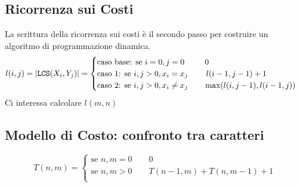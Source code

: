 \subsection{Ricorrenza sui Costi}
La scrittura della ricorrenza sui costi è il secondo passo per costruire un algoritmo di programmazione dinamica.
\begin{equation*}
l(i,j) = |\verb|LCS|(X_i,Y_j)| = 
\begin{cases}
    \text{caso base: se } i=0, j=0 \qquad\;\; 0 \\
    \text{caso 1: se } i,j>0, x_i = x_j \qquad\; l(i-1,j-1)+1 \\
    \text{caso 2: se } i,j>0, x_i \not= x_j \qquad \max(l(i,j-1),l(i-1,j))
\end{cases}
\end{equation*}
Ci interessa calcolare $l(m,n)$

\subsection{Modello di Costo: confronto tra caratteri}
\begin{equation*}
    T(n,m) =
    \begin{cases}
        \text{se } n,m=0 \qquad 0 \\
        \text{se } n,m>0 \qquad T(n-1,m) + T(n,m-1) + 1 \\
    \end{cases}
\end{equation*}

